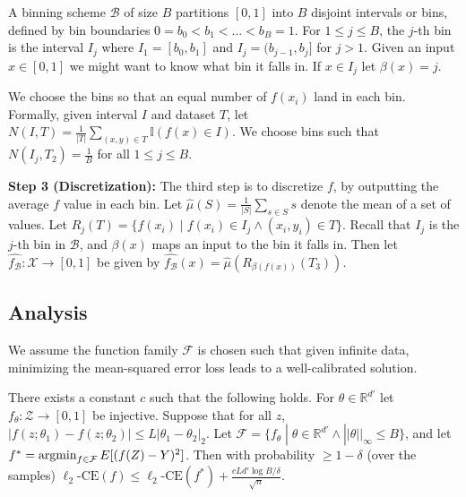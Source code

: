 \begin{definition}
A binning scheme $\mathcal{B}$ of size $B$ partitions $[0, 1]$ into $B$ disjoint intervals or bins, defined by bin boundaries $0 = b_0 < b_1 < ... < b_B = 1$. For $1 \leq j \leq B$, the $j$-th bin is the interval $I_j$ where $I_1 = [b_0, b_1]$ and $I_j = (b_{j-1}, b_j]$ for $j > 1$. Given an input $x \in [0, 1]$ we might want to know what bin it falls in. If $x \in I_j$ let $\beta(x) = j$.
\end{definition}

We choose the bins so that an equal number of $f(x_i)$ land in each bin. Formally, given interval $I$ and dataset $T$, let $N(I, T) = \frac{1}{|T|}\sum_{(x, y) \in T} \mathbb{I}(f(x) \in I)$. We choose bins such that $N(I_j, T_2) = \frac{1}{B}$ for all $1 \leq j \leq B$. 

\textbf{Step 3 (Discretization):} The third step is to discretize $f$, by outputting the average $f$ value in each bin. Let $\hat{\mu}(S) = \frac{1}{|S|} \sum_{s \in S} s$ denote the mean of a set of values. Let $R_j(T) = \{ f(x_i) \; | \; f(x_i) \in I_j \wedge (x_i, y_i) \in T \}$. Recall that $I_j$ is the $j$-th bin in $\mathcal{B}$, and $\beta(x)$ maps an input to the bin it falls in. Then let $\hat{f_{\mathcal{B}}} : \mathcal{X} \to [0, 1]$ be given by $\hat{f_{\mathcal{B}}}(x) = \hat{\mu}(R_{\beta(f(x))}(T_3))$.

\subsection{Analysis}



We assume the function family $\mathcal{F}$ is chosen such that given infinite data, minimizing the mean-squared error loss leads to a well-calibrated solution.

\begin{proposition}
\label{thm:mse-convergence}
 There exists a constant $c$ such that the following holds. For $\theta \in  \mathbb{R}^{d'}$ let $f_{\theta} : \mathcal{Z} \to [0, 1]$ be injective. Suppose that for all $z$, $|f(z; \theta_1) - f(z; \theta_2)| \leq L|\theta_1 - \theta_2|_2$. Let $\mathcal{F} = \{ f_{\theta} \; | \; \theta \in \mathbb{R}^{d'} \wedge ||\theta||_{\infty} \leq B \}$, and let $f^* = \mathop{\mbox{argmin}}_{f \in \mathcal{F}}{E[(f(Z) - Y)^2]}$. Then with probability $\geq 1 - \delta$ (over the samples) $\ell_2\mbox{-CE}(f) \leq \ell_2\mbox{-CE}(f^*) + \frac{cLd' \log{B/\delta}}{\sqrt{n}}$. 
\end{proposition}

